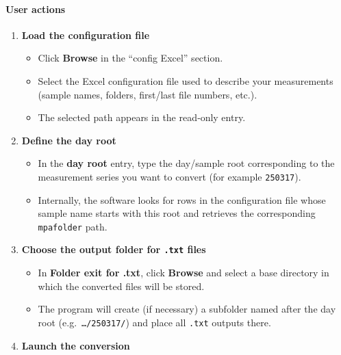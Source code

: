 \hypertarget{user-actions}{%
\paragraph{User actions}\label{user-actions}}

\begin{enumerate}
\def\labelenumi{\arabic{enumi}.}
\tightlist
\item
  \textbf{Load the configuration file}

  \begin{itemize}
  \tightlist
  \item
    Click \textbf{Browse} in the ``config Excel'' section.\\
  \item
    Select the Excel configuration file used to describe your
    measurements (sample names, folders, first/last file numbers,
    etc.).\\
  \item
    The selected path appears in the read‑only entry.
  \end{itemize}
\item
  \textbf{Define the day root}

  \begin{itemize}
  \tightlist
  \item
    In the \textbf{day root} entry, type the day/sample root
    corresponding to the measurement series you want to convert (for
    example \texttt{250317}).\\
  \item
    Internally, the software looks for rows in the configuration file
    whose sample name starts with this root and retrieves the
    corresponding \texttt{mpafolder} path.
  \end{itemize}
\item
  \textbf{Choose the output folder for \texttt{.txt} files}

  \begin{itemize}
  \tightlist
  \item
    In \textbf{Folder exit for .txt}, click \textbf{Browse} and select a
    base directory in which the converted files will be stored.\\
  \item
    The program will create (if necessary) a subfolder named after the
    day root (e.g.~\texttt{\ldots{}/250317/}) and place all
    \texttt{.txt} outputs there.
  \end{itemize}
\item
  \textbf{Launch the conversion}


\end{enumerate}
